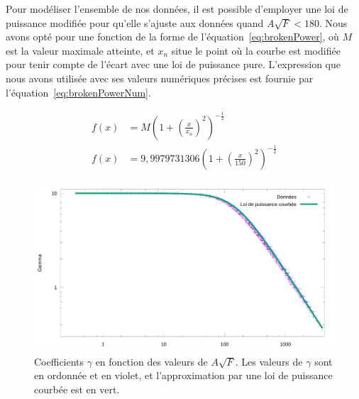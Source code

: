 	
	Pour modéliser l'ensemble de nos données, il est possible d'employer une loi de puissance modifiée pour qu'elle s'ajuste aux données quand $A\sqrt{F}<180$. Nous avons opté pour une fonction de la forme de l'équation~\ref{eq:brokenPower}, où $M$ est la valeur maximale atteinte, et $x_{n}$ situe le point où la courbe est modifiée pour tenir compte de l'écart avec une loi de puissance pure. L'expression que nous avons utilisée avec ses valeurs numériques précises est fournie par l'équation~\ref{eq:brokenPowerNum}.
	
	\begin{align}
		\label{eq:brokenPower}
		f(x) &= M \left( 1 + \left( \frac{x}{x_{n}} \right) ^{2} \right)^{-\frac{1}{2}} \\
		\label{eq:brokenPowerNum}
		f(x) &= 9,9979731306 \left( 1 + \left( \frac{x}{150} \right) ^{2} \right)^{-\frac{1}{2}}
	\end{align}
	
	\begin{figure}[!htb]
		\centering
		\includegraphics[width=\textwidth]{figures/ch4/asqrtFVgammaLogLogPowerFit}
		\caption[Coefficients $\gamma$ vs. F et A, quinquies (log-log et loi de puissance)]{Coefficients $\gamma$ en fonction des valeurs de $A\sqrt{F}$. Les valeurs de $\gamma$ sont en ordonnée et en violet, et l'approximation par une loi de puissance courbée est en vert.}
		\label{fig:asqrtFVgammaLogLogPowerFit}
	\end{figure}
	

